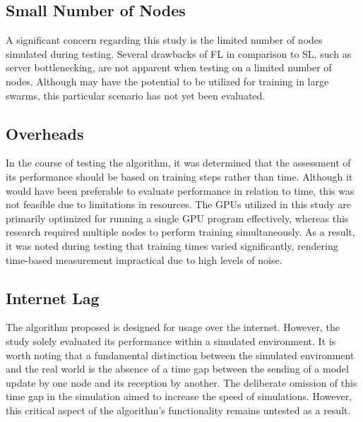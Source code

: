 \subsection{Small Number of Nodes}
A significant concern regarding this study is the limited number of nodes simulated during testing. Several drawbacks of FL in comparison to SL, such as server bottlenecking, are not apparent when testing on a limited number of nodes. Although \SL may have the potential to be utilized for training in large swarms, this particular scenario has not yet been evaluated.

\subsection{Overheads}
In the course of testing the \SL algorithm, it was determined that the assessment of its performance should be based on training steps rather than time. Although it would have been preferable to evaluate performance in relation to time, this was not feasible due to limitations in resources. The GPUs utilized in this study are primarily optimized for running a single GPU program effectively, whereas this research required multiple nodes to perform training simultaneously. As a result, it was noted during testing that training times varied significantly, rendering time-based measurement impractical due to high levels of noise.

\subsection{Internet Lag}
The algorithm proposed is designed for usage over the internet. However, the study solely evaluated its performance within a simulated environment. It is worth noting that a fundamental distinction between the simulated environment and the real world is the absence of a time gap between the sending of a model update by one node and its reception by another. The deliberate omission of this time gap in the simulation aimed to increase the speed of simulations. However, this critical aspect of the algorithm's functionality remains untested as a result.